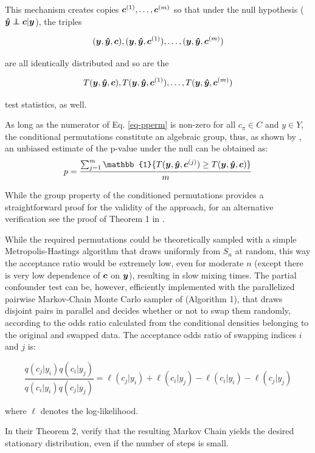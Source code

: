 \documentclass{article}
\begin{document}
This mechanism creates copies $\boldsymbol{c}^{(1)}, \dots ,\boldsymbol{c}^{(m)}$ so that under the null hypothesis ($\yhat \independent \c | \y$), the triples 

$$(\boldsymbol{y},\boldsymbol{\hat{y}},\boldsymbol{c}), (\boldsymbol{y}, \boldsymbol{\hat{y}}, \boldsymbol{c}^{(1)}),\dots, (\boldsymbol{y}, \boldsymbol{\hat{y}}, \boldsymbol{c}^{(m)})$$

are all identically distributed and so are the 

$$T(\boldsymbol{y},\boldsymbol{\hat{y}},\boldsymbol{c}), T(\boldsymbol{y}, \boldsymbol{\hat{y}}, \boldsymbol{c}^{(1)}),\dots,T(\boldsymbol{y}, \boldsymbol{\hat{y}}, \boldsymbol{c}^{(m)})$$

test statistics, as well.

As long as the numerator of Eq. \ref{eq-pperm} is non-zero for all $c_\pi \in C$ and $y \in Y$, the conditional permutations constitute an algebraic group, thus, as shown by \citep{hemerik2018exact}, an unbiased estimate of the p-value under the null can be obtained as:
$$ p= \frac{\sum_{j=1}^m \mathbb{1} \{T(\y, \yhat, \c^{(j)}) \geq T(\y, \yhat, \c) \}  }{m}$$

While the group property of the conditioned permutations provides a straightforward proof for the validity of the approach, for an alternative verification see the proof of Theorem 1 in \citep{berrett2020conditional}.

While the required permutations could be theoretically sampled with a simple Metropolis-Hastings algorithm that draws uniformly from $S_n$ at random, this way the acceptance ratio would be extremely low, even for moderate $n$ (except there is very low dependence of $\boldsymbol{c}$ on $\boldsymbol{y}$), resulting in slow mixing times. The partial confounder test can be, however, efficiently implemented with the parallelized pairwise Markov-Chain Monte Carlo sampler of \cite{berrett2020conditional} (Algorithm 1), that draws disjoint pairs in parallel and decides whether or not to swap them randomly, according to the odds ratio calculated from the conditional densities belonging to the original and swapped data. The acceptance odds ratio of swapping indices $i$ and $j$ is:

\begin{equation}
\frac{ q(c_j | y_i) q(c_i | y_j)}{q(c_i | y_i) q(c_j | y_j) }
=
\ell(c_j | y_i) + \ell(c_i | y_j) - \ell(c_i | y_i) - \ell(c_j | y_j) 
\label{eq:accept-odds}
\end{equation}

where $\ell$ denotes the log-likelihood.

In their Theorem 2, \cite{berrett2020conditional} verify that the resulting Markov Chain yields the desired stationary distribution, even if the number of steps is small.
\end{document}
